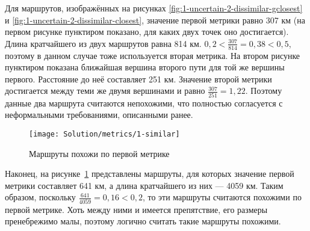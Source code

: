 Для маршрутов, изображённых на рисунках
\ref{fig:1-uncertain-2-dissimilar-gclosest} и
\ref{fig:1-uncertain-2-dissimilar-closest}, значение первой метрики
равно 307 км (на первом рисунке пунктиром показано, для каких двух
точек оно достигается). Длина кратчайшего из двух маршрутов равна 814
км. $0,2 < \frac{307}{814} = 0,38 < 0,5$, поэтому в данном случае тоже
используется вторая метрика. На втором рисунке пунктиром показана
ближайшая вершина второго пути для той же вершины первого. Расстояние
до неё составляет 251 км. Значение второй метрики достигается между
теми же двумя вершинами и равно $\frac{307}{251} = 1,22$. Поэтому
данные два маршрута считаются непохожими, что полностью согласуется с
неформальными требованиями, описанными ранее.

\begin{figure}
    \texttt{[image: Solution/metrics/1-similar]}
    \caption{Маршруты похожи по первой метрике}
    \label{fig:1-similar}
\end{figure}

Наконец, на рисунке~\ref{fig:1-similar} представлены маршруты, для
которых значение первой метрики составляет 641 км, а длина кратчайшего
из них --- 4059 км. Таким образом, поскольку $\frac{641}{4059} = 0,16
< 0,2$, то эти маршруты считаются похожими по первой метрике. Хоть
между ними и имеется препятствие, его размеры пренебрежимо малы,
поэтому логично считать такие маршруты похожими.



\FloatBarrier

